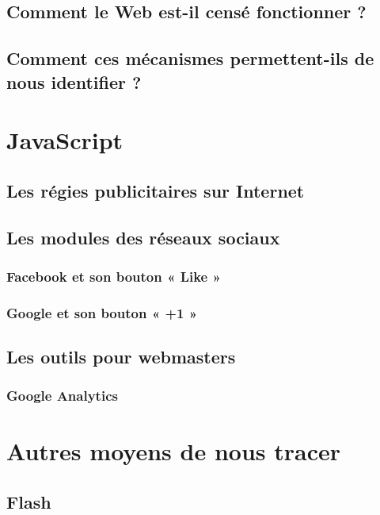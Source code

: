 \documentclass[a4paper,12pt,french]{report}
\begin{document}
	\section{Comment le Web est-il censé fonctionner ?}
		
	\section{Comment ces mécanismes permettent-ils de nous identifier ?}
		
\chapter{JavaScript}
	\section{Les régies publicitaires sur Internet}
		
	\section{Les modules des réseaux sociaux}
		
		\subsection{Facebook et son bouton « Like »}
			
		\subsection{Google et son bouton « +1 »}
			
	\section{Les outils pour webmasters}
		
		\subsection{Google Analytics}
			
\chapter{Autres moyens de nous tracer}
	\section{Flash}
		
\end{document}
